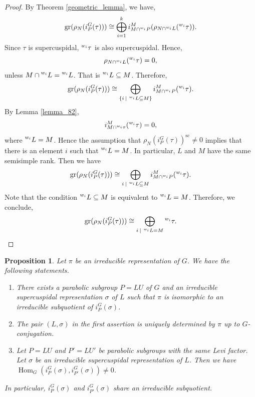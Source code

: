 \documentclass[8pt]{article}
\newtheorem{proposition}{Proposition}[section]
\DeclareMathOperator{\Hom}{Hom}
\DeclareMathOperator{\gr}{gr}
\DeclareMathOperator{\supcus}{sc}
\newcommand{\sep}[0]{\:|\:}
\begin{document}
\begin{proof}
  By Theorem \ref{geometric_lemma}, we have,
  \begin{equation*}
    \gr(\rho_N(i_P^G(\tau))) \cong \bigoplus_{i=1}^k i_{M\cap\prescript{w_i}{}{P}}^M(\rho_{N\cap\prescript{w_i}{}{L}}(\prescript{w_i}{}{\tau})).
  \end{equation*}
  Since $\tau$ is supercuspidal, $\prescript{w_i}{}{\tau}$ is also supercuspidal. Hence, 
  \begin{equation*}
    \rho_{N\cap\prescript{w_i}{}{L}}(\prescript{w_i}{}{\tau}) = 0,
  \end{equation*}
  unless $M\cap \prescript{w_i}{}{L}=\prescript{w_i}{}{L}$. That is $\prescript{w_i}{}{L}\subseteq M$. Therefore,
  \begin{equation*}
    \gr(\rho_N(i_P^G(\tau)))\cong\bigoplus_{\{i\sep \prescript{w_i}{}{L}\subseteq M\}}i_{M\cap \prescript{w_i}{}{P}}^M(\prescript{w_i}{}{\tau}).
  \end{equation*}
  By Lemma \ref{lemma_82}, 
  \begin{equation*}
    i_{M\cap\prescript{w_i}{}{\tau}}^M(\prescript{w_i}{}{\tau}) = 0,
  \end{equation*}
  where $\prescript{w_i}{}{L}=M$. Hence the assumption that $\rho_N(i_P^G(\tau))^{\supcus}\not=0$ implies that there is an element $i$ such that $\prescript{w_i}{}{L}=M$.
  In particular, $L$ and $M$ have the same semisimple rank. Then we have 
  \begin{equation*}
    \gr(\rho_N(i_P^G(\tau))) \cong \bigoplus_{i\sep \prescript{w_i}{}{L}\subseteq M}i_{M\cap\prescript{w_i}{}{P}}^M(\prescript{w_i}{}{\tau}).
  \end{equation*}
  Note that the condition $\prescript{w_i}{}{L}\subseteq M$ is equivalent to $\prescript{w_i}{}{L}= M$. Therefore, we conclude,
  \begin{equation*}
    \gr(\rho_N(i_P^G(\tau))) \cong \bigoplus_{i\sep \prescript{w_i}{}{L}= M}\prescript{w_i}{}{\tau}.
  \end{equation*}
\end{proof}

\begin{proposition}
  \label{proposition_84}
  Let $\pi$ be an irreducible representation of $G$. We have the following statements.
  \begin{enumerate}[1).]
    \item There exists a parabolic subgroup $P=LU$ of $G$ and an irreducible supercuspidal representation $\sigma$ of $L$ such that $\pi$ is isomorphic to an irreducible subquotient of $i_P^G(\sigma)$.
    \item The pair $(L,\sigma)$ in the first assertion is uniquely determined by $\pi$ up to $G$-conjugation.
    \item Let $P=LU$ and $P' = LU'$ be parabolic subgroups with the same Levi factor. Let $\sigma$ be an irreducible supercuspidal representation of $L$. Then we have $\Hom_G(i_P^G(\sigma),i_{P'}^G(\sigma))\not=0$. 
  \end{enumerate}
  In particular, $i_P^G(\sigma)$ and $i_{P'}^G(\sigma)$ share an irreducible subquotient.
\end{proposition}
\end{document}
